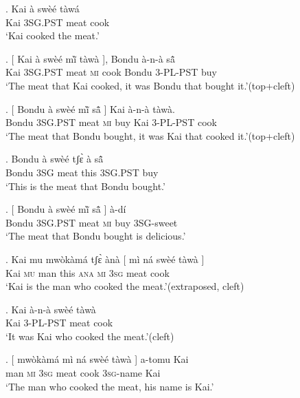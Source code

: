 \documentclass{assets/fieldnotes}
\begin{document}
{\exg. Kai à swèé tàwá\\
Kai \textsc{3SG.PST} meat cook\\
`Kai cooked the meat.'


\exg. {[} Kai à swèé mĩ̀ tàwà {]}, Bondu à-n-à sã̂\\
{} Kai \textsc{3SG.PST} meat \textsc{mi} cook {} Bondu \textsc{3-PL-PST} buy\\
`The meat that Kai cooked, it was Bondu that bought it.'\hfill{(top+cleft)}\label{kai_cook_bondu_buy_cleft}

\exg. {[} Bondu à swèé mĩ̀ sã̂ {]} Kai à-n-à tàwà.\\
{} Bondu \textsc{3SG.PST} meat \textsc{mi} buy {} Kai \textsc{3-PL-PST} cook\\
`The meat that Bondu bought, it was Kai that cooked it.'\hfill{(top+cleft)}\label{bondu_buy_kai_cook_cleft}

\exg. Bondu à swèé tʃɛ̀ à sã̂\\
Bondu \textsc{3SG} meat this \textsc{3SG.PST} buy\\
`This is the meat that Bondu bought.'

\exg. {[} Bondu à swèé mĩ̀ sã̂ {]} à-dí\\
{} Bondu \textsc{3SG.PST} meat \textsc{mi} buy {} \textsc{3SG}-sweet\\
`The meat that Bondu bought is delicious.'\label{bondu_buy_meat_delicious}


\exg. Kai mu mwòkàmá tʃɛ̀ ànà {[} mì ná swèé tàwà {]}\\
Kai \textsc{mu} man this \textsc{ana} {} \textsc{mi} \textsc{3sg} meat cook {}\\
`Kai is the man who cooked the meat.'\hfill{(extraposed, cleft)}

\exg. Kai à-n-à swèé tàwà\\
Kai \textsc{3-PL-PST} meat cook\\
`It was Kai who cooked the meat.'\hfill{(cleft)}\\

\exg. {[} mwòkàmá mì ná swèé tàwà {]} a-tomu Kai\\
{} man \textsc{mi} \textsc{3sg} meat cook {} \textsc{3sg}-name Kai\\
`The man who cooked the meat, his name is Kai.'\label{man_cook_meat_name_kai}

}
\end{document}
